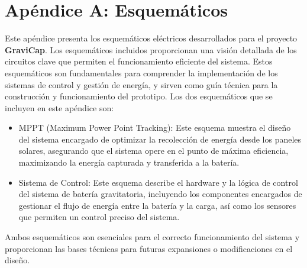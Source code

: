\chapter{Apéndice A: Esquemáticos}
\renewcommand{\thepage}{A-\arabic{page}}
\setcounter{page}{1}
    Este apéndice presenta los esquemáticos eléctricos desarrollados para el proyecto \textcolor{dark_violet}{\textbf{GraviCap}}. Los esquemáticos incluidos proporcionan una visión detallada de los circuitos clave que permiten el funcionamiento eficiente del sistema. Estos esquemáticos son fundamentales para comprender la implementación de los sistemas de control y gestión de energía, y sirven como guía técnica para la construcción y funcionamiento del prototipo.
    Los dos esquemáticos que se incluyen en este apéndice son:\par
    
    \begin{itemize} [label = ]
    \setlength{\itemindent}{2em}
    
        \item MPPT (Maximum Power Point Tracking): Este esquema muestra el diseño del sistema encargado de optimizar la recolección de energía desde los paneles solares, asegurando que el sistema opere en el punto de máxima eficiencia, maximizando la energía capturada y transferida a la batería.\par
        \item Sistema de Control: Este esquema describe el hardware y la lógica de control del sistema de batería gravitatoria, incluyendo los componentes encargados de gestionar el flujo de energía entre la batería y la carga, así como los sensores que permiten un control preciso del sistema.\par
    \end{itemize}
    
    Ambos esquemáticos son esenciales para el correcto funcionamiento del sistema y proporcionan las bases técnicas para futuras expansiones o modificaciones en el diseño.\par

